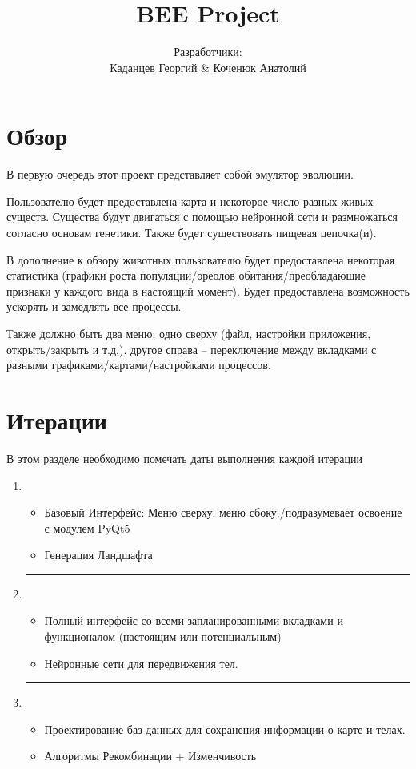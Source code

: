 \documentclass[12pt,a4paper, titlepage]{article}
\title{BEE Project}
\author{Разработчики: \\Каданцев Георгий \& Коченюк Анатолий}
\begin{document}
\maketitle
\section{Обзор}

В первую очередь этот проект представляет собой эмулятор эволюции. 

Пользователю будет предоставлена карта и некоторое число разных живых существ. Существа будут двигаться с помощью нейронной сети и размножаться согласно основам генетики. Также будет существовать пищевая цепочка(и).

В дополнение к обзору животных пользователю будет предоставлена некоторая статистика (графики роста популяции/ореолов обитания/преобладающие признаки у каждого вида в настоящий момент). Будет предоставлена возможность ускорять и замедлять все процессы. 

Также должно быть два меню: одно сверху (файл, настройки приложения, открыть/закрыть и т.д.). другое справа -- переключение между вкладками с разными графиками/картами/настройками процессов. 
\section{Итерации}
В этом разделе необходимо помечать даты выполнения каждой итерации
\begin{enumerate}
	\item 
	\begin{itemize}
		\item Базовый Интерфейс: Меню сверху, меню сбоку./подразумевает освоение с модулем PyQt5
		\item Генерация Ландшафта 
	\end{itemize}
	\hrule
	\item 
	\begin{itemize}
		\item Полный интерфейс со всеми запланированными вкладками и функционалом (настоящим или потенциальным)
		\item Нейронные сети для передвижения тел.
	\end{itemize}
	\hrule
	\item 
	\begin{itemize}
		\item Проектирование баз данных для сохранения информации о карте и телах.
		\item Алгоритмы Рекомбинации + Изменчивость
	\end{itemize}
\end{enumerate}
\end{document}
